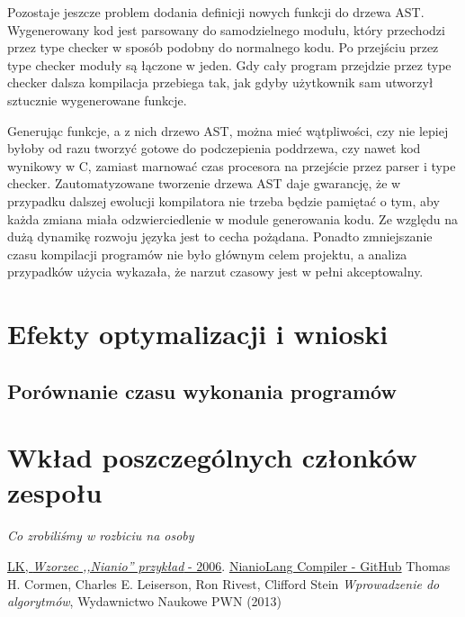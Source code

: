 \documentclass[licencjacka]{pracamgr}
\begin{document}
Pozostaje jeszcze problem dodania definicji nowych funkcji do drzewa AST. Wygenerowany kod jest parsowany do samodzielnego modułu,
który przechodzi przez type checker w sposób podobny do normalnego kodu. Po przejściu przez type checker moduły są łączone w jeden. Gdy cały program przejdzie przez type checker
dalsza kompilacja przebiega tak, jak gdyby użytkownik sam utworzył sztucznie wygenerowane funkcje.

Generując funkcje, a z nich drzewo AST, można mieć wątpliwości, czy nie lepiej byłoby od razu tworzyć gotowe do podczepienia poddrzewa, czy nawet kod wynikowy w C,
zamiast marnować czas procesora na przejście przez parser i type checker. 
Zautomatyzowane tworzenie drzewa AST daje gwarancję, że w przypadku dalszej ewolucji kompilatora nie trzeba będzie pamiętać o tym,
aby każda zmiana miała odzwierciedlenie w module generowania kodu. Ze względu na dużą dynamikę rozwoju języka jest to cecha pożądana.
Ponadto zmniejszanie czasu kompilacji programów nie było głównym celem projektu, a analiza przypadków użycia wykazała, że narzut czasowy jest w pełni akceptowalny.

\chapter{Efekty optymalizacji i wnioski}
\section{Porównanie czasu wykonania programów}

\chapter{Wkład poszczególnych członków zespołu}
\emph{Co zrobiliśmy w rozbiciu na osoby}


\appendix

\begin{thebibliography}{99}

 \href{https://www.mimuw.edu.pl/~chrzaszc/BPJ20067/nianio.pdf}{LK, \textit{Wzorzec ,,Nianio'' przykład} - 2006}.
 \href{https://github.com/nianiolang/nl}{NianioLang Compiler - GitHub}
 Thomas H. Cormen, Charles E. Leiserson, Ron Rivest, Clifford Stein \textit{Wprowadzenie do algorytmów}, Wydawnictwo Naukowe PWN (2013)


\end{thebibliography}
\end{document}
